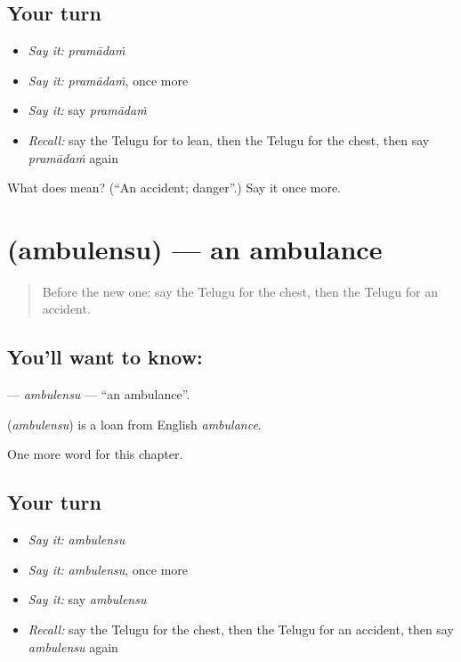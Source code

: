 \subsection*{Your turn}
\begin{itemize}
\raggedright
  \item \emph{Say it:} \emph{pramādaṁ}
  \item \emph{Say it:} \emph{pramādaṁ}, once more
  \item \emph{Say it:} say \emph{pramādaṁ}
  \item \emph{Recall:} say the Telugu for to lean, then the Telugu for the chest, then say \emph{pramādaṁ} again
\end{itemize}

\begin{tcolorbox}[breakable,colback=teal!4,colframe=teal!35!black,title={Before you move on}]
What does  mean? (\textquotedblleft{}An accident; danger\textquotedblright{}.) Say it once more.
\end{tcolorbox}
\section[\texorpdfstring{\te{అంబులెన్సు} (ambulensu)}{అంబులెన్సు (ambulensu)}]{ (ambulensu) — an ambulance}

\label{lesson:TE-C287-ambulensu}



\begin{quote}
Before the new one: say the Telugu for the chest, then the Telugu for an accident.
\end{quote}

\subsection*{You'll want to know: }
\textbf{} — \emph{ambulensu} — \textquotedblleft{}an ambulance\textquotedblright{}.

\begin{cousinweb}
\textbf{} (\emph{ambulensu}) is a loan from English \emph{ambulance}.
\end{cousinweb}

\begin{grammarlens}[title={What you've built}]
One more word for this chapter.
\end{grammarlens}

\subsection*{Your turn}
\begin{itemize}
\raggedright
  \item \emph{Say it:} \emph{ambulensu}
  \item \emph{Say it:} \emph{ambulensu}, once more
  \item \emph{Say it:} say \emph{ambulensu}
  \item \emph{Recall:} say the Telugu for the chest, then the Telugu for an accident, then say \emph{ambulensu} again
\end{itemize}

